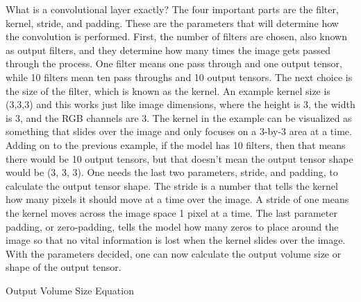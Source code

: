 \documentclass[12pt]{article}
\begin{document}
                What is a convolutional layer exactly? The four important parts are the filter, kernel, stride, and padding. 
                These are the parameters that will determine how the convolution is performed. 
                First, the number of filters are chosen, also known as output filters, 
                and they determine how many times the image gets passed through the process. 
                One filter means one pass through and one output tensor, while 10 filters mean ten pass throughs and 10 output tensors. 
                The next choice is the size of the filter, which is known as the kernel. 
                An example kernel size is (3,3,3) and this works just like image dimensions, 
                where the height is 3, the width is 3, and the RGB channels are 3. 
                The kernel in the example can be visualized as something that slides over the image 
                and only focuses on a 3-by-3 area at a time. Adding on to the previous example, if the model has 10 filters, 
                then that means there would be 10 output tensors, but that doesn’t mean the output tensor shape would be (3, 3, 3). 
                One needs the last two parameters, stride, and padding, to calculate the output tensor shape. 
                The stride is a number that tells the kernel how many pixels it should move at a time over the image. 
                A stride of one means the kernel moves across the image space 1 pixel at a time. 
                The last parameter padding, or zero-padding, tells the model how many zeros to place around the image 
                so that no vital information is lost when the kernel slides over the image. With the parameters decided, 
                one can now calculate the output volume size or shape of the output tensor.
                
                Output Volume Size Equation
                


\end{document}
